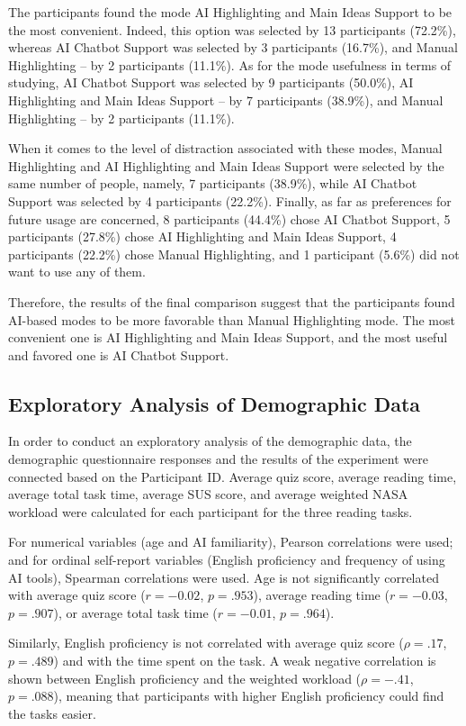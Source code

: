\documentclass{IEEEtran}
\begin{document}
The participants found the mode AI Highlighting and Main Ideas Support to be the most convenient. Indeed, this option was selected by 13 participants (72.2\%), whereas AI Chatbot Support was selected by 3 participants (16.7\%), and Manual Highlighting – by 2 participants (11.1\%). As for the mode usefulness in terms of studying, AI Chatbot Support was selected by 9 participants (50.0\%), AI Highlighting and Main Ideas Support – by 7 participants (38.9\%), and Manual Highlighting – by 2 participants (11.1\%).

When it comes to the level of distraction associated with these modes, Manual Highlighting and AI Highlighting and Main Ideas Support were selected by the same number of people, namely, 7 participants (38.9\%), while AI Chatbot Support was selected by 4 participants (22.2\%). Finally, as far as preferences for future usage are concerned, 8 participants (44.4\%) chose AI Chatbot Support, 5 participants (27.8\%) chose AI Highlighting and Main Ideas Support, 4 participants (22.2\%) chose Manual Highlighting, and 1 participant (5.6\%) did not want to use any of them.

Therefore, the results of the final comparison suggest that the participants found AI-based modes to be more favorable than Manual Highlighting mode. The most convenient one is AI Highlighting and Main Ideas Support, and the most useful and favored one is AI Chatbot Support.


\subsection{Exploratory Analysis of Demographic Data}

In order to conduct an exploratory analysis of the demographic data, the demographic questionnaire responses and the results of the experiment were connected based on the Participant ID. Average quiz score, average reading time, average total task time, average SUS score, and average weighted NASA workload were calculated for each participant for the three reading tasks.

For numerical variables (age and AI familiarity), Pearson correlations were used; and for ordinal self-report variables (English proficiency and frequency of using AI tools), Spearman correlations were used. Age is not significantly correlated with average quiz score ($r=-0.02$, $p=.953$), average reading time ($r=-0.03$, $p=.907$), or average total task time ($r=-0.01$, $p=.964$).

Similarly, English proficiency is not correlated with average quiz score ($\rho=.17$, $p=.489$) and with the time spent on the task. A weak negative correlation is shown between English proficiency and the weighted workload ($\rho=-.41$, $p=.088$), meaning that participants with higher English proficiency could find the tasks easier.
\end{document}
